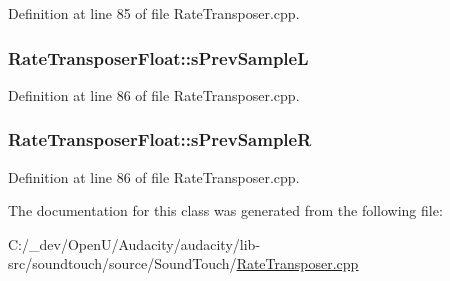 Definition at line 85 of file Rate\+Transposer.\+cpp.

\subsubsection[{\texorpdfstring{s\+Prev\+SampleL}{sPrevSampleL}}]{ Rate\+Transposer\+Float\+::s\+Prev\+SampleL\hspace{0.3cm}{\ttfamily [protected]}}\hypertarget{class_rate_transposer_float_aeb1ec0e078350074ec6b7f68a162abe4}{}\label{class_rate_transposer_float_aeb1ec0e078350074ec6b7f68a162abe4}


Definition at line 86 of file Rate\+Transposer.\+cpp.

\subsubsection[{\texorpdfstring{s\+Prev\+SampleR}{sPrevSampleR}}]{ Rate\+Transposer\+Float\+::s\+Prev\+SampleR\hspace{0.3cm}{\ttfamily [protected]}}\hypertarget{class_rate_transposer_float_aeb80ba2fdc05cc3d51b8562bd1530bda}{}\label{class_rate_transposer_float_aeb80ba2fdc05cc3d51b8562bd1530bda}


Definition at line 86 of file Rate\+Transposer.\+cpp.



The documentation for this class was generated from the following file\+:\begin{DoxyCompactItemize}
\item 
C\+:/\+\_\+dev/\+Open\+U/\+Audacity/audacity/lib-\/src/soundtouch/source/\+Sound\+Touch/\hyperlink{_rate_transposer_8cpp}{Rate\+Transposer.\+cpp}\end{DoxyCompactItemize}
